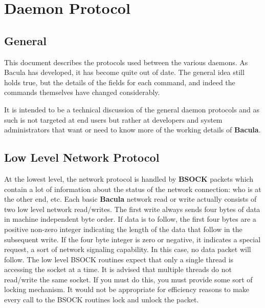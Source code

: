 
\chapter{Daemon Protocol}
\label{_ChapterStart2}

\section{General}

This document describes the protocols used between the various daemons. As
Bacula has developed, it has become quite out of date. The general idea still
holds true, but the details of the fields for each command, and indeed the
commands themselves have changed considerably. 

It is intended to be a technical discussion of the general daemon protocols
and as such is not targeted at end users but rather at developers and system
administrators that want or need to know more of the working details of {\bf
Bacula}. 

\section{Low Level Network Protocol}

At the lowest level, the network protocol is handled by {\bf BSOCK} packets
which contain a lot of information about the status of the network connection:
who is at the other end, etc. Each basic {\bf Bacula} network read or write
actually consists of two low level network read/writes. The first write always
sends four bytes of data in machine independent byte order. If data is to
follow, the first four bytes are a positive non-zero integer indicating the
length of the data that follow in the subsequent write. If the four byte
integer is zero or negative, it indicates a special request, a sort of network
signaling capability. In this case, no data packet will follow. The low level
BSOCK routines expect that only a single thread is accessing the socket at a
time. It is advised that multiple threads do not read/write the same socket.
If you must do this, you must provide some sort of locking mechanism. It would
not be appropriate for efficiency reasons to make every call to the BSOCK
routines lock and unlock the packet. 

